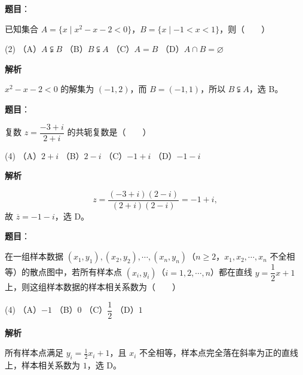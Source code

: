 

\begin{answer}

\textbf{题目}：

已知集合 $A=\{x\mid x^2-x-2<0\}$，$B=\{x\mid -1<x<1\}$，则\mbox{（　　）}

\begin{gkopts}(2)
\task （A）$A\subsetneqq B$
\task （B）$B\subsetneqq A$
\task （C）$A=B$
\task （D）$A\cap B=\varnothing$
\end{gkopts}

\textbf{解析}

$x^2-x-2<0$ 的解集为 $(-1,2)$，而 $B=(-1,1)$，所以 $B\subsetneqq A$，选 B。


\end{answer}
\begin{answer}

\textbf{题目}：

复数 $z=\dfrac{-3+i}{2+i}$ 的共轭复数是\mbox{（　　）}

\begin{gkopts}(4)
\task （A）$2+i$
\task （B）$2-i$
\task （C）$-1+i$
\task （D）$-1-i$
\end{gkopts}

\textbf{解析}

\nopagebreak[4]
\[
z=\frac{(-3+i)(2-i)}{(2+i)(2-i)}=-1+i,
\]
故 $\overline z=-1-i$，选 D。


\end{answer}
\begin{answer}

\textbf{题目}：

在一组样本数据 $(x_1,y_1),(x_2,y_2),\cdots,(x_n,y_n)$（$n\geqslant2$，$x_1,x_2,\cdots,x_n$ 不全相等）的散点图中，若所有样本点 $(x_i,y_i)$（$i=1,2,\cdots,n$）都在直线 $y=\dfrac12x+1$ 上，则这组样本数据的样本相关系数为\mbox{（　　）}

\begin{gkopts}(4)
\task （A）$-1$
\task （B）$0$
\task （C）$\dfrac12$
\task （D）$1$
\end{gkopts}

\textbf{解析}

所有样本点满足 $y_i=\frac12x_i+1$，且 $x_i$ 不全相等，样本点完全落在斜率为正的直线上，样本相关系数为 $1$，选 D。


\end{answer}
